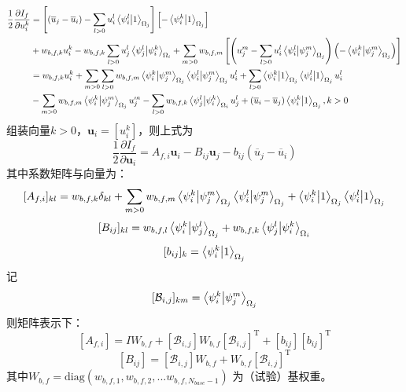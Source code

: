 \documentclass[UTF8,zihao=5]{ctexart} %
\newcommand{\bm}[1]{{\mathbf{#1}}}
\newcommand{\trans}[0]{^\mathrm{T}}
\newcommand*{\pd}[2]{\frac{\partial #1}{\partial #2}}
\newcommand*{\uu}[0]{\bm{u}}
\newcommand*{\mean}[1]{\overline{#1}}
\begin{document}
$$
    \begin{aligned}
        \frac{1}{2}\pd{I_f}{u_i^k}
         & =
        \left[
            (\mean{u}_j - \mean{u}_i)
            - \sum_{l>0}u_i^l\innerproduct{\psi_i^l}{1}_{\Omega_j}
            \right]\left[
            - \innerproduct{\psi_i^k}{1}_{\Omega_j}
            \right]
        \\
         & +
         w_{b,f,k} u_i^k
        - w_{b,f,k}\sum_{l>0}u_j^l\innerproduct{\psi_j^l}{\psi_i^k}_{\Omega_i}
        +
        \sum_{m>0}
        w_{b,f,m}\left[
            {\left(
                    u_j^m
                    - \sum_{l>0}u_i^l\innerproduct{\psi_i^l}{\psi_j^m}_{\Omega_j}
                    \right)\left(
                    - \innerproduct{\psi_i^k}{\psi_j^m}_{\Omega_j}
                    \right)}
        \right]                                                                                                 \\
         & =
         w_{b,f,k}u_i^k +
        \sum_{m>0}\sum_{l>0}w_{b,f,m}
        \innerproduct{\psi_i^k}{\psi_j^m}_{\Omega_j}
        \innerproduct{\psi_i^l}{\psi_j^m}_{\Omega_j}u_i^l +
        \sum_{l>0}\innerproduct{\psi_i^k}{1}_{\Omega_j}\innerproduct{\psi_i^l}{1}_{\Omega_j}u_i^l \\
         &
        - \sum_{m>0}w_{b,f,m}\innerproduct{\psi_i^k}{\psi_j^m}_{\Omega_j}u_j^m
        - \sum_{l>0}w_{b,f,k}\innerproduct{\psi_j^l}{\psi_i^k}_{\Omega_i}u_j^l
        + (\mean{u}_i - \mean{u}_j)\innerproduct{\psi_i^k}{1}_{\Omega_j}
        , k>0
    \end{aligned}
$$
组装向量$k>0$，$\uu_i=[u_i^k]$，则上式为
$$
\frac{1}{2}\pd{I_f}{\uu_i} = A_{f,i} \uu_i - B_{ij} \uu_j - 
b_{ij}(\mean{u}_j - \mean{u}_i ) 
$$
其中系数矩阵与向量为：
$$
[A_{f,i}]_{kl} = w_{b,f,k} \delta_{kl} +
\sum_{m>0}  
w_{b,f,m}
\innerproduct{\psi_i^k}{\psi_j^m}_{\Omega_j}
\innerproduct{\psi_i^l}{\psi_j^m}_{\Omega_j}
+
\innerproduct{\psi_i^k}{1}_{\Omega_j}
\innerproduct{\psi_i^l}{1}_{\Omega_j}
$$
$$
[B_{ij}]_{kl} = 
w_{b,f,l}\innerproduct{\psi_i^k}{\psi_j^l}_{\Omega_j}
+
w_{b,f,k}\innerproduct{\psi_j^l}{\psi_i^k}_{\Omega_i}
$$
$$
[b_{ij}]_{k} = 
\innerproduct{\psi_i^k}{1}_{\Omega_j}
$$
记
$$
[\mathcal{B}_{i,j}]_{km}=\innerproduct{\psi_i^k}{\psi_j^m}_{\Omega_j}
$$
则矩阵表示下：
$$
[A_{f,i}] = I W_{b,f} +
[\mathcal{B}_{i,j}] W_{b,f} [\mathcal{B}_{i,j}]\trans
+
[b_{ij}][b_{ij}]\trans
$$
$$
[B_{ij}] = 
[\mathcal{B}_{i,j}]W_{b,f}
+
W_{b,f}[\mathcal{B}_{i,j}]\trans
$$
其中$W_{b,f}=\text{diag}(w_{b,f,1},w_{b,f,2},...w_{b,f,N_{base}-1})$
为（试验）基权重。
\end{document}
